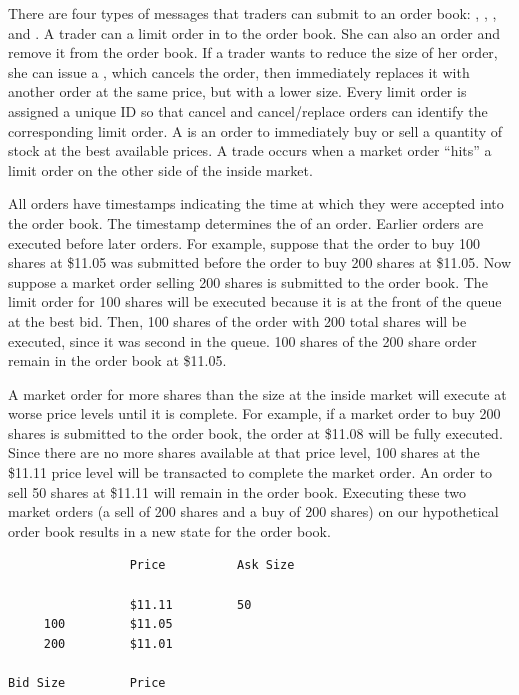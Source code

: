 There are four types of messages that traders can submit to an order
book: , , , and
. A trader can  a limit order in to the
order book.  She can also  an order and remove it from
the order book. If a trader wants to reduce the size of her order, she
can issue a , which cancels the order, then
immediately replaces it with another order at the same price, but with
a lower size. Every limit order is assigned a unique ID so that cancel
and cancel/replace orders can identify the corresponding limit
order. A  is an order to immediately buy or sell a
quantity of stock at the best available prices. A trade occurs when a
market order ``hits'' a limit order on the other side of the inside
market.

All orders have timestamps indicating the time at which they were
accepted into the order book. The timestamp determines the  of an order. Earlier orders are executed before later
orders. For example, suppose that the order to buy 100 shares at
\$11.05 was submitted before the order to buy 200 shares at
\$11.05. Now suppose a market order selling 200 shares is submitted to
the order book. The limit order for 100 shares will be executed
because it is at the front of the queue at the best bid. Then, 100
shares of the order with 200 total shares will be executed, since it
was second in the queue. 100 shares of the 200 share order remain in
the order book at \$11.05.

A market order for more shares than the size at the inside market will
execute at worse price levels until it is complete. For example, if a
market order to buy 200 shares is submitted to the order book, the
order at \$11.08 will be fully executed. Since there are no more
shares available at that price level, 100 shares at the \$11.11 price
level will be transacted to complete the market order. An order to
sell 50 shares at \$11.11 will remain in the order book. Executing
these two market orders (a sell of 200 shares and a buy of 200 shares)
on our hypothetical order book results in a new state for the order
book.

\begin{verbatim}
                 Price          Ask Size

                 $11.11         50
     100         $11.05
     200         $11.01

Bid Size         Price
\end{verbatim}

